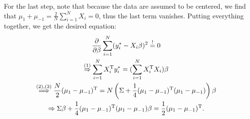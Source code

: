 \documentclass{article}
\newcommand{\T}{{\rm T}}
\begin{document}
For the last step, note that because the data are assumed to be centered, we find that $\mu_1 + \mu_{-1} = \frac{2}{N} \sum_{i=1}^N X_i = 0$, thus the last term vanishes. Putting everything together, we get the desired equation:
\begin{gather*}
\frac{\partial}{\partial \beta} \sum_{i=1}^N (y_i^* - X_i \beta)^2 \overset{\text{!}}{=} 0\\
\overset{\text{(1)}}{\Rightarrow} \sum_{i=1}^N X_i^\T y_i^* = (\sum_{i=1}^N X_i^\T X_i)\beta\\
\overset{\text{(2),(3)}}{\Longrightarrow} \frac{N}{2} (\mu_1 - \mu_{-1})^\T = N\left(\Sigma + \frac{1}{4}(\mu_1 - \mu_{-1})^\T (\mu_1 - \mu_{-1})\right) \beta\\
\Rightarrow \Sigma \beta + \frac{1}{4}(\mu_1 - \mu_{-1})^\T (\mu_1 - \mu_{-1}) \beta = \frac{1}{2} (\mu_1 - \mu_{-1})^\T.
\end{gather*}
\end{document}
